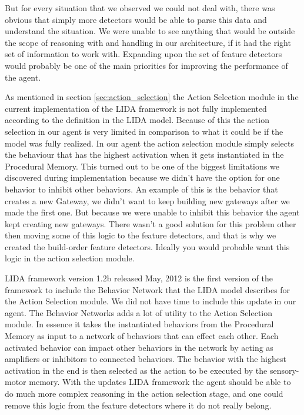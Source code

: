 But for every situation that we observed we could not deal with, there was obvious that simply more detectors would be able to parse this data and understand the situation. We were unable to see anything that would be outside the scope of reasoning with and handling in our architecture, if it had the right set of information to work with. Expanding upon the set of feature detectors would probably be one of the main priorities for improving the performance of the agent.

As mentioned in section \ref{sec:action_selection} the Action Selection module in the current implementation of the LIDA framework is not fully implemented according to the definition in the LIDA model. Because of this the action selection in our agent is very limited in comparison to what it could be if the model was fully realized. In our agent the action selection module simply selects the behaviour that has the highest activation when it gets instantiated in the Procedural Memory. This turned out to be one of the biggest limitations we discovered during implementation because we didn't have the option for one behavior to inhibit other behaviors. An example of this is the behavior that creates a new Gateway, we didn't want to keep building new gateways after we made the first one. But because we were unable to inhibit this behavior the agent kept creating new gateways. There wasn't a good solution for this problem other then moving some of this logic to the feature detectors, and that is why we created the build-order feature detectors. Ideally you would probable want this logic in the action selection module.

LIDA framework version 1.2b released May, 2012 is the first version of the framework to include the Behavior Network that the LIDA model describes for the Action Selection module. We did not have time to include this update in our agent. The Behavior Networks adds a lot of utility to the Action Selection module. In essence it takes the instantiated behaviors from the Procedural Memory as input to a network of behaviors that can effect each other. Each activated behavior can impact other behaviors in the network by acting as amplifiers or inhibitors to connected behaviors. The behavior with the highest activation in the end is then selected as the action to be executed by the sensory-motor memory. With the updates LIDA framework the agent should be able to do much more complex reasoning in the action selection stage, and one could remove this logic from the feature detectors where it do not really belong.

